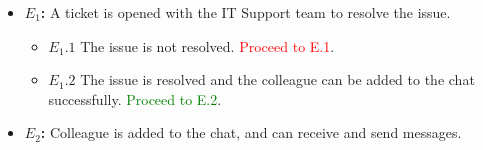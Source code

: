 \documentclass[]{article}
\begin{document}
\begin{enumerate}[\bf {BE}7.]
{{\begin{itemize}
					\item {\bf $E_{1}$:}  A ticket is opened with the IT Support team to resolve the issue.
					      \begin{itemize}
						      \item {\bf $E_{1}.1$} The issue is not resolved. \textcolor{red}{Proceed to E.1}.
						      \item {\bf $E_{1}.2$} The issue is resolved and the colleague can be added to the chat successfully. \textcolor{green}{Proceed to E.2}.
					      \end{itemize}
					\item {\bf $E_{2}$:}  Colleague is added to the chat, and can receive and send messages.

				\end{itemize}
			}%
		}%
\end{enumerate}
\end{document}
